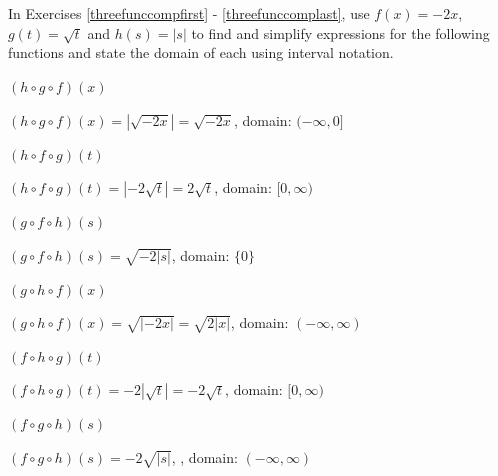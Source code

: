 \documentclass{ximera}
\begin{document}
\begin{question}
In Exercises \ref{threefunccompfirst} - \ref{threefunccomplast}, use $f(x) = -2x$, $g(t) = \sqrt{t}$ and $h(s) = |s|$ to find and simplify expressions for the following functions and state the domain of each using interval notation.

\begin{problem}\label{threefunccompfirst}
$(h\circ g \circ f)(x)$ 

\begin{solution}
    $(h\circ g \circ f)(x)= |\sqrt{-2x}|= \sqrt{-2x}$, domain: $(-\infty, 0]$ 
\end{solution}

\end{problem}

\begin{problem}
$(h\circ f \circ g)(t)$

\begin{solution}
    $(h\circ f \circ g)(t) = |-2\sqrt{t}|= 2\sqrt{t}$, domain: $[0,\infty)$
\end{solution}
\end{problem}
 
\begin{problem}
$(g\circ f \circ h)(s)$

\begin{solution}
    $(g\circ f \circ h)(s) = \sqrt{-2|s|}$, domain:  $\{0\}$
\end{solution}
\end{problem}

\begin{problem}
$(g\circ h \circ f)(x)$

\begin{solution}
    $(g\circ h \circ f)(x) = \sqrt{|-2x|} = \sqrt{2|x|}$, domain: $(-\infty, \infty)$ 
\end{solution}
\end{problem}  

\begin{problem}
$(f\circ h \circ g)(t)$

\begin{solution}
    $(f\circ h \circ g)(t) = -2|\sqrt{t}| = -2\sqrt{t}$, domain: $[0,\infty)$
\end{solution}
\end{problem} 

\begin{problem}\label{threefunccomplast}
$(f\circ g \circ h)(s)$ 

\begin{solution}
    $(f\circ g \circ h)(s) = -2\sqrt{|s|}$, , domain: $(-\infty,\infty)$
\end{solution}
\end{problem} 

\end{question}
\end{document}
